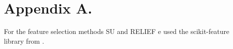 \documentclass[twoside,11pt]{article}
\begin{document}

\newpage

\appendix
\section*{Appendix A.}
For the feature selection methods SU and RELIEF e used the scikit-feature library from \cite{Li-etal16}.
\label{app:some appendix}


\vskip 0.2in

\end{document}
